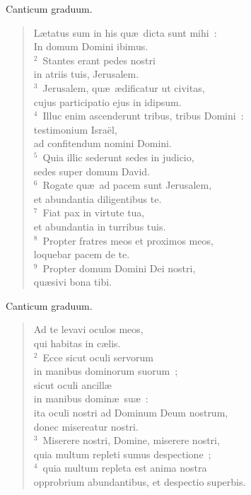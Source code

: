 \bchapter
\lettrine[lines=3,image=true,loversize=0.05,lraise=-0.03]{C}{}anticum graduum. \begin{flushleft}\begin{verse}\vspace{6pt}L\ae tatus sum in his qu\ae\ dicta sunt mihi~:\\ In domum Domini ibimus.\\
${}^{2}$~Stantes erant pedes nostri\\ in atriis tuis, Jerusalem.\\
${}^{3}$~Jerusalem, qu\ae\ \ae dificatur ut civitas,\\ cujus participatio ejus in idipsum.\\
${}^{4}$~Illuc enim ascenderunt tribus, tribus Domini~:\\ testimonium Isra\"el,\\ ad confitendum nomini Domini.\\
${}^{5}$~Quia illic sederunt sedes in judicio,\\ sedes super domum David.\\
${}^{6}$~Rogate qu\ae\ ad pacem sunt Jerusalem,\\ et abundantia diligentibus te.\\
${}^{7}$~Fiat pax in virtute tua,\\ et abundantia in turribus tuis.\\
${}^{8}$~Propter fratres meos et proximos meos,\\ loquebar pacem de te.\\
${}^{9}$~Propter domum Domini Dei nostri,\\ qu\ae sivi bona tibi.\end{verse}\end{flushleft}



\bchapter
\lettrine[lines=3,image=true,loversize=0.05,lraise=-0.03]{C}{}anticum graduum. \begin{flushleft}\begin{verse}\vspace{6pt}Ad te levavi oculos meos,\\ qui habitas in c\ae lis.\\
${}^{2}$~Ecce sicut oculi servorum\\ in manibus dominorum suorum~;\\ sicut oculi ancill\ae \\ in manibus domin\ae\ su\ae~:\\ ita oculi nostri ad Dominum Deum nostrum,\\ donec misereatur nostri.\\
${}^{3}$~Miserere nostri, Domine, miserere nostri,\\ quia multum repleti sumus despectione~;\\
${}^{4}$~quia multum repleta est anima nostra\\ opprobrium abundantibus, et despectio superbis.\end{verse}\end{flushleft}




